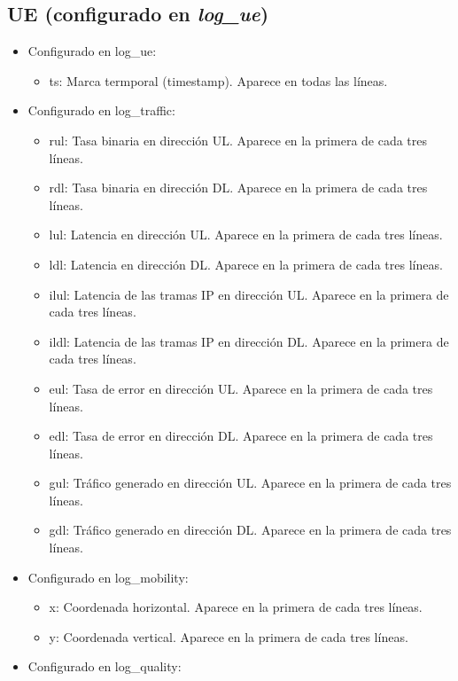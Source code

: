 \documentclass[12pt]{report} %
\begin{document}
\subsection* {UE (configurado en \textit{log\_ue})}

\begin{itemize}
\item {
Configurado en log\_ue:
\begin{itemize}
\item ts: Marca termporal (timestamp). Aparece en todas las líneas.
\end{itemize}
}
\item {
Configurado en log\_traffic:
\begin{itemize}
\item rul: Tasa binaria en dirección UL. Aparece en la primera de cada tres líneas.
\item rdl: Tasa binaria en dirección DL. Aparece en la primera de cada tres líneas.
\item lul: Latencia en dirección UL. Aparece en la primera de cada tres líneas.
\item ldl: Latencia en dirección DL. Aparece en la primera de cada tres líneas.
\item ilul: Latencia de las tramas IP en dirección UL. Aparece en la primera de cada tres líneas.
\item ildl: Latencia de las tramas IP en dirección DL. Aparece en la primera de cada tres líneas.
\item eul: Tasa de error en dirección UL. Aparece en la primera de cada tres líneas.
\item edl: Tasa de error en dirección DL. Aparece en la primera de cada tres líneas.
\item gul: Tráfico generado en dirección UL. Aparece en la primera de cada tres líneas.
\item gdl: Tráfico generado en dirección DL. Aparece en la primera de cada tres líneas.
\end{itemize}
}
\item {
Configurado en log\_mobility:
\begin{itemize}
\item x: Coordenada horizontal. Aparece en la primera de cada tres líneas.
\item y: Coordenada vertical. Aparece en la primera de cada tres líneas.
\end{itemize}
}
\item {
Configurado en log\_quality:
\begin{itemize}

\end{itemize}}
\end{itemize}
\end{document}
